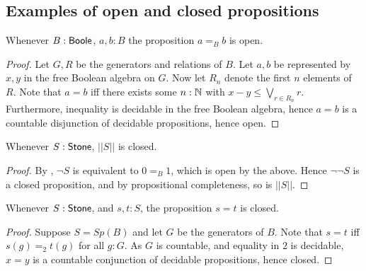 \subsection{Examples of open and closed propositions}
\begin{lemma}\label{BooleEqualityOpen}
  Whenever $B:\mathsf{Boole}$, $a,b:B$ the proposition $a=_Bb$ is open. 
\end{lemma}
\begin{proof}
  Let $G,R$ be the generators and relations of $B$. 
  Let $a,b$ be represented by $x,y$ in the free Boolean algebra on $G$. 
  Now let $R_n$ denote the first $n$ elements of $R$. 
  Note that $a=b$ iff there exists some $n:\mathbb{N}$ with $x-y \leq \bigvee_{r\in R_n} r$. 
  Furthermore, inequality is decidable in the free Boolean algebra, hence
  $a=b$ is a countable disjunction of decidable propositions, hence open. 
\end{proof}
\begin{corollary}\label{TruncationStoneClosed}
  Whenever $S:\mathsf{Stone}$, $||S||$ is closed. 
\end{corollary}
\begin{proof}
  By , $\neg S$ is equivalent to $0=_B 1$, which is open by the above. 
  Hence $\neg \neg S$ is a closed proposition, and by propositional completeness, so is $||S||$. 
\end{proof}

\begin{lemma}\label{StoneEqualityClosed}
  Whenever $S:\mathsf{Stone}$, and $s,t:S$, the proposition $s=t$ is closed. 
\end{lemma}
\begin{proof}
  Suppose $S= Sp(B)$ and let $G$ be the generators of $B$. 
  Note that $s=t$ iff $s(g) =_2 t(g)$ for all $g:G$. 
  As $G$ is countable, and equality in $2$ is decidable, 
  $x=y$ is a countable conjunction of decidable propositions, hence closed. 
\end{proof}

